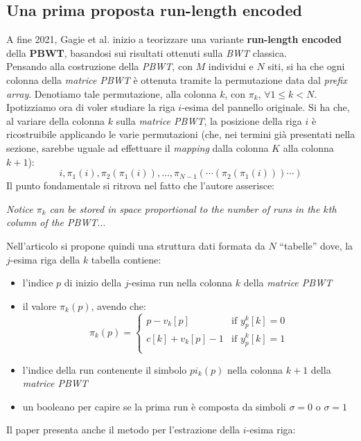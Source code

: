\subsection{Una prima proposta run-length encoded}
\label{subsectravis}
A fine 2021, Gagie et al. \cite{tricks} inizio a teorizzare una variante
\textbf{run-length encoded} della \textbf{PBWT}, basandosi sui risultati
ottenuti sulla \textit{BWT} classica.\\
Pensando alla costruzione della \textit{PBWT}, con $M$ individui e $N$ siti, si
ha che ogni colonna della 
\textit{matrice PBWT} è ottenuta tramite la permutazione data dal \textit{prefix
  array}. Denotiamo tale permutazione, alla colonna $k$, con $\pi_k$, $\forall
1\leq k<N$. 
Ipotizziamo ora di voler studiare la riga $i$-esima del pannello originale. Si
ha che, al variare della colonna $k$ sulla \textit{matrice PBWT}, la posizione
della riga $i$ è ricostruibile applicando le varie permutazioni (che, nei
termini già presentati nella sezione, sarebbe uguale ad effettuare il
\textit{mapping} dalla colonna $K$ alla colonna $k+1$):
\[i, \pi_1(i), \pi_2(\pi_1(i)),\ldots,
  \pi_{N-1}(\cdots(\pi_2(\pi_1(i)))\cdots)\]
Il punto fondamentale si ritrova nel fatto che l'autore asserisce:
\begin{center}
  \textit{Notice $\pi_k$ can be stored in space proportional to the number of
    runs in the $k$th column of the PBWT$\ldots$} 
\end{center}
Nell'articolo si propone quindi una struttura dati formata da $N$ ``tabelle''
dove, la $j$-esima riga della $k$ tabella contiene: 
\begin{itemize}
  \item l'indice $p$ di inizio della $j$-esima run nella colonna $k$ della
  \textit{matrice PBWT}
  \item il valore $\pi_k(p)$, avendo che:
  \[\pi_k(p)=
    \begin{cases}
      p-v_k[p]&\mbox{if } y_p^k[k]=0\\
      c[k]+v_k[p]-1&\mbox{if } y_p^k[k]=1\\
    \end{cases}
  \]
  
  \item l'indice della run contenente il simbolo $pi_k(p)$ nella colonna $k+1$
  della \textit{matrice PBWT}
  \item un booleano per capire se la prima run è composta da simboli $\sigma=0$
  o $\sigma =1$
\end{itemize}
Il paper presenta anche il metodo per l'estrazione della $i$-esima riga:
